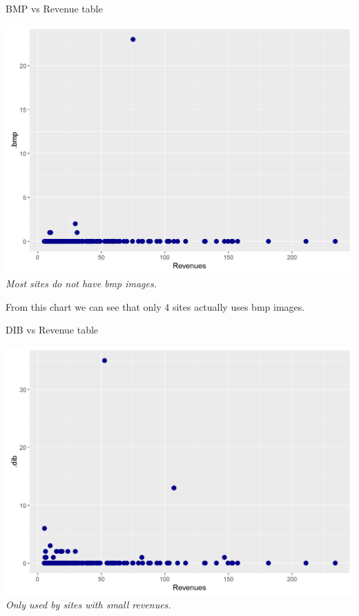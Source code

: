 \documentclass{book}
\begin{document}
\begin{table}[H]
\centering
\caption{BMP vs Revenue table}
\begin{center}
\includegraphics[scale=0.5]{../R/photos/54_bmp_rev.png}    \\
\textit{Most sites do not have bmp images.}
\end{center}
\end{table}
From this chart we can see that only 4 sites actually uses bmp images.
\begin{table}[H]
\centering
\caption{DIB vs Revenue table}
\begin{center}
\includegraphics[scale=0.5]{../R/photos/55_dib_rev.png}    \\
\textit{Only used by sites with small revenues.}
\end{center}
\end{table}
\end{document}
